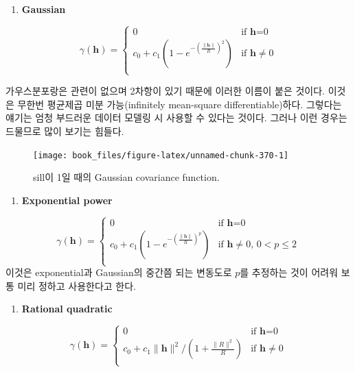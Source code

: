 \documentclass[b5paper,]{scrbook}
\providecommand{\tightlist}{%
  \setlength{\itemsep}{0pt}\setlength{\parskip}{0pt}}
\theoremstyle{plain}
\theoremstyle{definition}
\numberwithin{equation}{section}
\begin{document}
\begin{enumerate}
\def\labelenumi{\arabic{enumi}.}
\setcounter{enumi}{3}
\tightlist
\item
  \textbf{Gaussian}
\end{enumerate}

\[
\gamma(\mathbf{h})= \left\{ \begin{array}{ll}
0 & \textrm{if $\mathbf{h}$=0}\\
c_{0}+c_{1}(1-e^{-(\frac{\|\mathbf{h}\|}{R})^{2}}) & \textrm{if $\mathbf{h}\neq 0$}\\
\end{array} \right.
\]

가우스분포랑은 관련이 없으며 2차항이 있기 때문에 이러한 이름이 붙은 것이다. 이것은 무한번 평균제곱 미분 가능(infinitely mean-square differentiable)하다. 그렇다는 얘기는 엄청 부드러운 데이터 모델링 시 사용할 수 있다는 것이다. 그러나 이런 경우는 드물므로 많이 보기는 힘들다.

\begin{figure}

{\centering \texttt{[image: book\_files/figure-latex/unnamed-chunk-370-1]} 

}

\caption{sill이 1일 때의 Gaussian covariance function.}\label{fig:unnamed-chunk-370}
\end{figure}

\begin{enumerate}
\def\labelenumi{\arabic{enumi}.}
\setcounter{enumi}{4}
\tightlist
\item
  \textbf{Exponential power}
\end{enumerate}

\[
\gamma(\mathbf{h})= \left\{ \begin{array}{ll}
0 & \textrm{if $\mathbf{h}$=0}\\
c_{0}+c_{1}(1-e^{-(\frac{\|\mathbf{h}\|}{R})^{p}}) & \textrm{if $\mathbf{h}\neq 0$, $0 < p \leq 2$}\\
\end{array} \right.
\]
이것은 exponential과 Gaussian의 중간쯤 되는 변동도로 \(p\)를 추정하는 것이 어려워 보통 미리 정하고 사용한다고 한다.

\begin{enumerate}
\def\labelenumi{\arabic{enumi}.}
\setcounter{enumi}{5}
\tightlist
\item
  \textbf{Rational quadratic}
\end{enumerate}

\[
\gamma(\mathbf{h})= \left\{ \begin{array}{ll}
0 & \textrm{if $\mathbf{h}$=0}\\
c_{0}+c_{1}\| \mathbf{h}\|^{2}/(1+\frac{\|R\|^{2}}{R}) & \textrm{if $\mathbf{h}\neq 0$}\\
\end{array} \right.
\]
\end{document}
